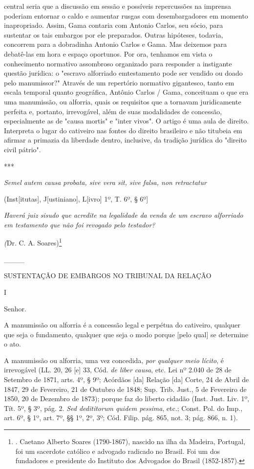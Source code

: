 {central seria que a discussão em sessão e possíveis repercussões na
imprensa poderiam entornar o caldo e aumentar rusgas com desembargadores
em momento inapropriado. Assim, Gama contaria com Antonio Carlos, seu
sócio, para sustentar os tais embargos por ele preparados. Outras
hipóteses, todavia, concorrem para a dobradinha Antonio Carlos e Gama.
Mas deixemos para debatê-las em hora e espaço oportunos. Por ora,
tenhamos em vista o conhecimento normativo assombroso organizado para
responder a instigante questão jurídica: o "escravo alforriado
emtestamento pode ser vendido ou doado pelo manumissor?" Através de um
repertório normativo gigantesco, tanto em escala temporal quanto
geográfica, Antônio Carlos / Gama, conceituam o que era uma manumissão,
ou alforria, quais os requisitos que a tornavam juridicamente perfeita
e, portanto, irrevogável, além de suas modalidades de concessão,
especialmente as de "causa mortis" e "inter vivos". O artigo é uma aula
de direito. Interpreta o lugar do cativeiro nas fontes do direito
brasileiro e não titubeia em afirmar a primazia da liberdade dentro,
inclusive, da tradição jurídica do "direito civil pátrio". }

***

\emph{Semel autem causa probata, sive vera sit, sive falsa, non
retractatur}

(Inst{[}itutas{]}, J{[}ustiniano{]}, L{[}ivro{]} 1º, T. 6º, § 6º{]}

\emph{Haverá juiz sisudo que acredite na legalidade da venda de um
escravo alforriado em testamento que não foi revogado pelo testador?}

\emph{(}Dr. C. A. Soares)\footnote{. Caetano Alberto Soares (1790-1867),
  nascido na ilha da Madeira, Portugal, foi um sacerdote católico e
  advogado radicado no Brasil. Foi um dos fundadores e presidente do
  Instituto dos Advogados do Brasil (1852-1857).}

\_\_\_\_

SUSTENTAÇÃO DE EMBARGOS NO TRIBUNAL DA RELAÇÃO

I

Senhor.

A manumissão ou alforria é a concessão legal e perpétua do cativeiro,
qualquer que seja o fundamento, qualquer que seja o modo porque {[}pelo
qual{]} se determine o ato.

A manumissão ou alforria, uma vez concedida, \emph{por qualquer meio
lícito}, é irrevogável (LL. 20, 26 {[}e{]} 33, Cód. \emph{de liber
causa}, etc. Lei nº 2.040 de 28 de Setembro de 1871, arts. 4º, § 9º;
Acórdãos {[}da{]} Relação {[}da{]} Corte, 24 de Abril de 1847, 29 de
Fevereiro, 21 de Outubro de 1848; Sup. Trib. Just., 5 de Fevereiro de
1850, 20 de Dezembro de 1873); porque faz do liberto cidadão (Inst.
Just. Liv. 1º, Tít. 5º, § 3º, pág. 2. \emph{Sed dedititorum quidem
pessima}, etc.; Const. Pol. do Imp., art. 6º, § 1º, art. 7º, §§ 1º, 2º,
3º; Cód. Filip. pág. 865, not. 3; pág. 866, n. 1).

